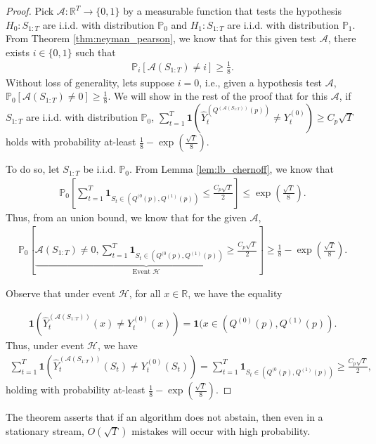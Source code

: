 \begin{proof}
Pick $\mathcal{A}: \mathbb{R}^T \to \{0,1\}$ by a measurable function that tests the hypothesis $H_0: S_{1:T}$ are i.i.d. with distribution $\mathbb{P}_0$ and $H_1: S_{1:T}$ are i.i.d. with distribution $\mathbb{P}_1$. From Theorem \ref{thm:neyman_pearson}, we know that for this given test $\mathcal{A}$, there exists $i \in \{0,1\}$ such that
\begin{align}
\mathbb{P}_i[\mathcal{A}(S_{1:T}) \neq i] \geq \frac{1}{8}.
\end{align}
Without loss of generality, lets suppose $i = 0$, i.e., given a hypothesis test $\mathcal{A}$, $\mathbb{P}_0[\mathcal{A}(S_{1:T}) \neq 0] \geq \frac{1}{8}$. We will show in the rest of the proof that for this $\mathcal{A}$, if $S_{1:T}$ are i.i.d. with distribution $\mathbb{P}_0$, $ \sum_{t=1}^T \mathbf{1} ( \widehat{Y}_t^{(Q^{(\mathcal{A}(S_{1:T}))}(p))} \neq Y_t^{(0)} ) \geq C_p \sqrt{T}$ holds with probability at-least $\frac{1}{8} -  \exp \left( \frac{\sqrt{T}}{8} \right)$.

To do so, let $S_{1:T}$ be i.i.d. $\mathbb{P}_0$. From Lemma \ref{lem:lb_chernoff}, we know that 
\begin{align*}
             \mathbb{P}_0\left[ \sum_{t=1}^T \mathbf{1}_{S_t \in (Q^{(0}(p), Q^{(1)}(p))} \leq \frac{C_p\sqrt{T}}{2} \right] \leq \exp \left( \frac{\sqrt{T}}{8} \right). 
\end{align*}
Thus, from an union bound, we know that for the given $\mathcal{A}$,
\begin{align*}
    \mathbb{P}_0 \left[ \underbrace{\mathcal{A}(S_{1:T}) \neq 0,  \sum_{t=1}^T \mathbf{1}_{S_t \in (Q^{(0}(p), Q^{(1)}(p))} \geq \frac{C_p\sqrt{T}}{2}  }_{\text{Event }\mathcal{H}}\right] \geq \frac{1}{8} - \exp \left( \frac{\sqrt{T}}{8} \right). 
\end{align*}

Observe that under event $\mathcal{H}$, for all $x \in \mathbb{R}$, we have the equality

\begin{align*}
     \mathbf{1} ( \widehat{Y}_t^{(\mathcal{A}(S_{1:T}))}(x) \neq Y_t^{(0)}(x) ) = \mathbf{1} (x \in (Q^{(0)}(p), Q^{(1)}(p)).
\end{align*}
Thus, under event $\mathcal{H}$, we have 
\begin{align*}
    \sum_{t=1}^T \mathbf{1} ( \widehat{Y}_t^{(\mathcal{A}(S_{1:T}))}(S_t) \neq Y_t^{(0)}(S_t) ) = \sum_{t=1}^T \mathbf{1}_{S_t \in (Q^{(0}(p), Q^{(1)}(p))} \geq \frac{C_p\sqrt{T}}{2},
\end{align*}
holding with probability at-least $\frac{1}{8} - \exp \left( \frac{\sqrt{T}}{8} \right).$
\end{proof}


The theorem asserts that if an algorithm does not abstain, then even in a stationary stream, $O(\sqrt{T})$ mistakes will occur with high probability. 


%
%
